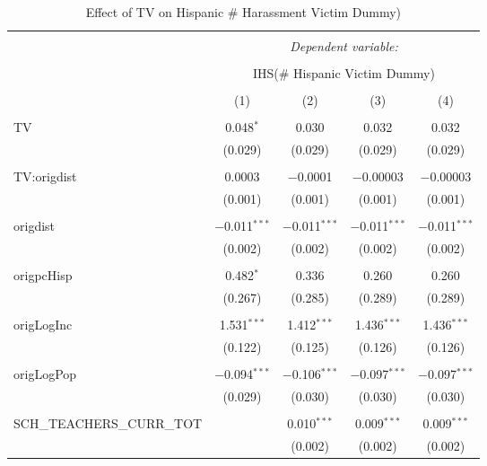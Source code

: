 
\begin{table}[!htbp] \centering 
  \caption{Effect of TV on Hispanic \# Harassment Victim Dummy)} 
  \label{} 
\begin{tabular}{@{\extracolsep{-2pt}}lcccc} 
\\[-1.8ex]\hline 
\hline \\[-1.8ex] 
 & \multicolumn{4}{c}{\textit{Dependent variable:}} \\ 
\cline{2-5} 
\\[-1.8ex] & \multicolumn{4}{c}{IHS(\# Hispanic Victim Dummy)} \\ 
\\[-1.8ex] & (1) & (2) & (3) & (4)\\ 
\hline \\[-1.8ex] 
 TV & 0.048$^{*}$ & 0.030 & 0.032 & 0.032 \\ 
  & (0.029) & (0.029) & (0.029) & (0.029) \\ 
  & & & & \\ 
 TV:origdist & 0.0003 & $-$0.0001 & $-$0.00003 & $-$0.00003 \\ 
  & (0.001) & (0.001) & (0.001) & (0.001) \\ 
  & & & & \\ 
 origdist & $-$0.011$^{***}$ & $-$0.011$^{***}$ & $-$0.011$^{***}$ & $-$0.011$^{***}$ \\ 
  & (0.002) & (0.002) & (0.002) & (0.002) \\ 
  & & & & \\ 
 origpcHisp & 0.482$^{*}$ & 0.336 & 0.260 & 0.260 \\ 
  & (0.267) & (0.285) & (0.289) & (0.289) \\ 
  & & & & \\ 
 origLogInc & 1.531$^{***}$ & 1.412$^{***}$ & 1.436$^{***}$ & 1.436$^{***}$ \\ 
  & (0.122) & (0.125) & (0.126) & (0.126) \\ 
  & & & & \\ 
 origLogPop & $-$0.094$^{***}$ & $-$0.106$^{***}$ & $-$0.097$^{***}$ & $-$0.097$^{***}$ \\ 
  & (0.029) & (0.030) & (0.030) & (0.030) \\ 
  & & & & \\ 
 SCH\_TEACHERS\_CURR\_TOT &  & 0.010$^{***}$ & 0.009$^{***}$ & 0.009$^{***}$ \\ 
  &  & (0.002) & (0.002) & (0.002) \\ 

\end{tabular}
\end{table}
